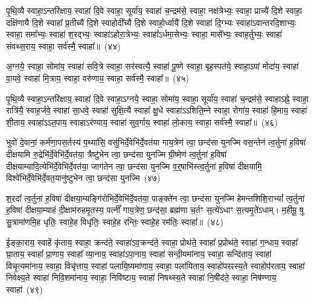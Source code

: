 पृ॒थि॒व्यै स्वाहा॒\-ऽन्तरि॑क्षाय॒ स्वाहा॑ दि॒वे स्वाहा॒ सूर्या॑य॒ स्वाहा॑ च॒न्द्रम॑से॒ स्वाहा॒ नक्ष॑त्रेभ्यः॒ स्वाहा॒ प्राच्यै॑ दि॒शे स्वाहा॒ दक्षि॑णायै दि॒शे स्वाहा᳚ प्र॒तीच्यै॑ दि॒शे स्वाहोदी᳚च्यै दि॒शे स्वाहो॒र्ध्वायै॑ दि॒शे स्वाहा॑ दि॒ग्भ्यः स्वाहा॑\-ऽ\-वान्तरदि॒शाभ्यः॒ स्वाहा॒ समा᳚भ्यः॒ स्वाहा॑ श॒रद्भ्यः॒ स्वाहा॑\-ऽहोरा॒त्रेभ्यः॒ स्वाहा᳚\-ऽर्धमा॒सेभ्यः॒ स्वाहा॒ मासे᳚भ्यः॒ स्वाह॒र्तुभ्यः॒ स्वाहा॑ संवथ्स॒राय॒ स्वाहा॒ सर्व॑स्मै॒ स्वाहा᳚॥~(४४)

{\anuvakamend[{}]}

अ॒ग्नये॒ स्वाहा॒ सोमा॑य॒ स्वाहा॑ सवि॒त्रे स्वाहा॒ सर॑स्वत्यै॒ स्वाहा॑ पू॒ष्णे स्वाहा॒ बृह॒स्पत॑ये॒ स्वाहा॒\-ऽपां मोदा॑य॒ स्वाहा॑ वा॒यवे॒ स्वाहा॑ मि॒त्राय॒ स्वाहा॒ वरु॑णाय॒ स्वाहा॒ सर्व॑स्मै॒ स्वाहा᳚॥~(४५)

{\anuvakamend[{}]}

पृ॒थि॒व्यै स्वाहा॒\-ऽन्तरि॑क्षाय॒ स्वाहा॑ दि॒वे स्वाहा॒\-ऽग्नये॒ स्वाहा॒ सोमा॑य॒ स्वाहा॒ सूर्या॑य॒ स्वाहा॑ च॒न्द्रम॑से॒ स्वाहा\-ऽह्ने॒ स्वाहा॒ रात्रि॑यै॒ स्वाह॒र्जवे॒ स्वाहा॑ सा॒धवे॒ स्वाहा॑ सुक्षि॒त्यै स्वाहा᳚ क्षु॒धे स्वाहा॑\-ऽऽ\-शिति॒म्ने स्वाहा॒ रोगा॑य॒ स्वाहा॑ हि॒माय॒ स्वाहा॑ शी॒ताय॒ स्वाहा॑\-ऽऽ\-त॒पाय॒ स्वाहा\-ऽर॑ण्याय॒ स्वाहा॑ सुव॒र्गाय॒ स्वाहा॑ लो॒काय॒ स्वाहा॒ सर्व॑स्मै॒ स्वाहा᳚॥~(४६)

{\anuvakamend[{}]}

भुवो॑ दे॒वानां॒ कर्म॑णा॒पस॒र्तस्य॑ प॒थ्या॑सि॒ वसु॑भिर्दे॒वेभि॑र्दे॒वत॑या गाय॒त्रेण॑ त्वा॒ छन्द॑सा युनज्मि वस॒न्तेन॑ त्व॒र्तुना॑ ह॒विषा॑ दीक्षयामि रु॒द्रेभि॑र्दे॒वेभि॑र्दे॒वत॑या॒ त्रैष्टु॑भेन त्वा॒ छन्द॑सा युनज्मि ग्री॒ष्मेण॑ त्व॒र्तुना॑ ह॒विषा॑ दीक्षयाम्यादि॒त्येभि॑\-र्दे॒वेभि॑र्दे॒वत॑या॒ जाग॑तेन त्वा॒ छन्द॑सा युनज्मि व॒र्॒\mbox{}षाभि॑स्त्व॒र्तुना॑ ह॒विषा॑ दीक्षयामि॒ विश्वे॑भिर्दे॒वेभि॑र्दे॒वत॒यानु॑ष्टुभेन त्वा॒ छन्द॑सा युनज्मि~(४७)

श॒रदा᳚ त्व॒र्तुना॑ ह॒विषा॑ दीक्षया॒म्यङ्गि॑रोभिर्दे॒वेभि॑र्दे॒वत॑या॒ पाङ्क्ते॑न त्वा॒ छन्द॑सा युनज्मि हेमन्तशिशि॒रा\-भ्यां᳚ त्व॒र्तुना॑ ह॒विषा॑ दीक्षया॒म्याहं दी॒क्षाम॑रुहमृ॒तस्य॒ पत्नीं᳚ गाय॒त्रेण॒ छन्द॑सा॒ ब्रह्म॑णा च॒र्तꣳ स॒त्ये॑\-ऽधाꣳ स॒त्यमृ॒ते॑\-ऽधाम्। म॒हीमू॒ षु सु॒त्रामा॑णमि॒ह धृतिः॒ स्वाहे॒ह विधृ॑तिः॒ स्वाहे॒ह रन्तिः॒ स्वाहे॒ह रम॑तिः॒ स्वाहा᳚॥~(४८)

{\anuvakamend[{}]}

ई॒ङ्का॒राय॒ स्वाहें कृ॑ताय॒ स्वाहा॒ क्रन्द॑ते॒ स्वाहा॑\-ऽव॒क्रन्द॑ते॒ स्वाहा॒ प्रोथ॑ते॒ स्वाहा᳚ प्र॒प्रोथ॑ते॒ स्वाहा॑ ग॒न्धाय॒ स्वाहा᳚ घ्रा॒ताय॒ स्वाहा᳚ प्रा॒णाय॒ स्वाहा᳚ व्या॒नाय॒ स्वाहा॑\-ऽपा॒नाय॒ स्वाहा॑ सन्दी॒यमा॑नाय॒ स्वाहा॒ सन्दि॑ताय॒ स्वाहा॑ विचृ॒त्यमा॑नाय॒ स्वाहा॒ विचृ॑त्ताय॒ स्वाहा॑ पलायि॒ष्यमा॑णाय॒ स्वाहा॒ पला॑यिताय॒ स्वाहो॑परꣴस्य॒ते स्वाहोप॑रताय॒ स्वाहा॑ निवेक्ष्य॒ते स्वाहा॑ निवि॒शमा॑नाय॒ स्वाहा॒ निवि॑ष्टाय॒ स्वाहा॑ निषथ्स्य॒ते स्वाहा॑ नि॒षीद॑ते॒ स्वाहा॒ निष॑ण्णाय॒ स्वाहा॑~(४९)




